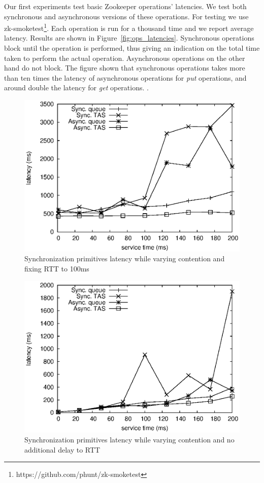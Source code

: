 Our first experiments test basic Zookeeper operations' latencies. We test both synchronous and asynchronous versions of these operations. For testing we use zk-smoketest\footnote{https://github.com/phunt/zk-smoketest}. Each operation is run for a thousand time and we report average latency. Results are shown in Figure~\ref{fig:ops_latencies}. Synchronous operations block until the operation is performed, thus giving an indication on the total time taken to perform the actual operation. Asynchronous operations on the other hand do not block. The figure shown that synchronous operations takes more than ten times the latency of asynchronous operations for \emph{put} operations, and around double the latency for \emph{get} operations. . 

\begin{figure}[h]
\centering
\includegraphics[scale=0.75]{img/primitives_vary-contention_rtt-100.eps}
\caption{Synchronization primitives latency while varying contention and fixing RTT to 100ms}
\label{fig:primitives_vary_contention_rtt100}
\end{figure}

\begin{figure}[h]
\centering
\includegraphics[scale=0.75]{img/primitives_vary-contention_rtt-0.eps}
\caption{Synchronization primitives latency while varying contention and no additional delay to RTT}
\label{fig:primitives_vary_contention_rtt0}
\end{figure}

